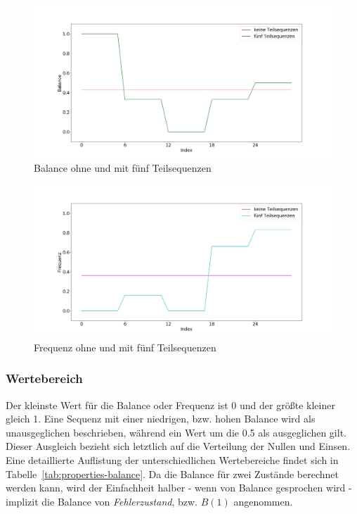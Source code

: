 \begin{theorem}
\begin{figure}[H]
	\centering
	\includegraphics[scale=0.32]{images/sequences/subsequences-balance}
	\caption{Balance ohne und mit fünf Teilsequenzen}
	\label{fig:properties-subsequences-balance}
\end{figure}

\begin{figure}[H]
	\centering
	\includegraphics[scale=0.32]{images/sequences/subsequences-frequency}
	\caption{Frequenz ohne und mit fünf Teilsequenzen}
	\label{fig:properties-subsequences-frequency}
\end{figure}
\end{theorem}

\subsubsection{Wertebereich}

Der kleinste Wert für die Balance oder Frequenz ist 0 und der größte kleiner gleich 1. Eine Sequenz mit einer niedrigen, bzw. hohen Balance wird als unausgeglichen beschrieben, während ein Wert um die 0.5 als ausgeglichen gilt. Dieser Ausgleich bezieht sich letztlich auf die Verteilung der Nullen und Einsen. Eine detaillierte Auflistung der unterschiedlichen Wertebereiche findet sich in Tabelle~\ref{tab:properties-balance}. Da die Balance für zwei Zustände berechnet werden kann, wird der Einfachheit halber - wenn von Balance gesprochen wird - implizit die Balance von \textit{Fehlerzustand}, bzw. $B(1)$ angenommen. 

